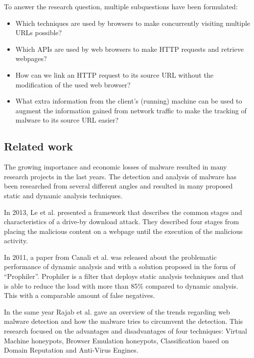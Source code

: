 To answer the research question, multiple subquestions have been formulated:

\begin{itemize}
\item Which techniques are used by browsers to make concurrently visiting multiple URLs possible?
\item Which APIs are used by web browsers to make HTTP requests and retrieve webpages?
\item How can we link an HTTP request to its source URL without the modification of the used web browser?
\item What extra information from the client's (running) machine can be used to augment the information gained from network traffic to make the tracking of malware to its source URL easier?
\end{itemize}


\subsection{Related work}

The growing importance and economic losses of malware resulted in many research projects in the last years. The detection and analysis of malware has been researched from several different angles \cite{auto_malware,Chang2013} and resulted in many proposed static and dynamic analysis techniques.

In 2013, Le et al. \cite{Le2013} presented a framework that describes the common stages and characteristics of a drive-by download attack. They described four stages from placing the malicious content on a webpage until the execution of the malicious activity.

In 2011, a paper from Canali et al. \cite{Canali2011} was released about the problematic performance of dynamic analysis and with a solution proposed in the form of ``Prophiler''. Prophiler is a filter that deploys static analysis techniques and that is able to reduce the load with more than 85\% compared to dynamic analysis. This with a comparable amount of false negatives.

In the same year Rajab et al. \cite{Rajab11trendsin} gave an overview of the trends regarding web malware detection and how the malware tries to circumvent the detection. This research focused on the advantages and disadvantages of four techniques: Virtual Machine honeypots, Browser Emulation honeypots, Classification based on Domain Reputation and Anti-Virus Engines.


